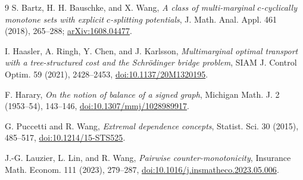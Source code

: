 \documentclass[11pt]{article}
\newcommand{\1}{\mathbf 1}
\begin{document}
\begin{thebibliography}{9}
S. Bartz, H. H. Bauschke, and X. Wang,
\emph{A class of multi-marginal $c$-cyclically monotone sets with explicit
$c$-splitting potentials},
J. Math. Anal. Appl. 461 (2018), 265--288;
\href{https://arxiv.org/abs/1608.04477}{arXiv:1608.04477}.

I. Haasler, A. Ringh, Y. Chen, and J. Karlsson,
\emph{Multimarginal optimal transport with a tree-structured cost and the
Schr\"odinger bridge problem},
SIAM J. Control Optim. 59 (2021), 2428--2453,
\href{https://doi.org/10.1137/20M1320195}{doi:10.1137/20M1320195}.

F. Harary,
\emph{On the notion of balance of a signed graph},
Michigan Math. J. 2 (1953--54), 143--146,
\href{https://doi.org/10.1307/mmj/1028989917}{doi:10.1307/mmj/1028989917}.

G. Puccetti and R. Wang,
\emph{Extremal dependence concepts},
Statist. Sci. 30 (2015), 485--517,
\href{https://doi.org/10.1214/15-STS525}{doi:10.1214/15-STS525}.

J.-G. Lauzier, L. Lin, and R. Wang,
\emph{Pairwise counter-monotonicity},
Insurance Math. Econom. 111 (2023), 279--287,
\href{https://doi.org/10.1016/j.insmatheco.2023.05.006}{doi:10.1016/j.insmatheco.2023.05.006}.
\end{thebibliography}
\end{document}
